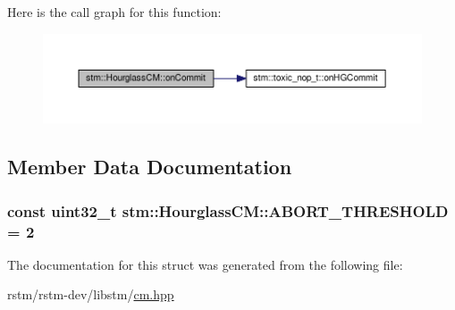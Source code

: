 Here is the call graph for this function\-:
\nopagebreak
\begin{figure}[H]
\begin{center}
\leavevmode
\includegraphics[width=350pt]{structstm_1_1HourglassCM_a59dc57fa05c484b45bd4fb1772d9f425_cgraph}
\end{center}
\end{figure}




\subsection{Member Data Documentation}
\hypertarget{structstm_1_1HourglassCM_ae26eaa2287446ea7c80a60341f1748d1}{
\subsubsection[{A\-B\-O\-R\-T\-\_\-\-T\-H\-R\-E\-S\-H\-O\-L\-D}]{\setlength{\rightskip}{0pt plus 5cm}const uint32\-\_\-t stm\-::\-Hourglass\-C\-M\-::\-A\-B\-O\-R\-T\-\_\-\-T\-H\-R\-E\-S\-H\-O\-L\-D = 2\hspace{0.3cm}{\ttfamily [static]}}}\label{structstm_1_1HourglassCM_ae26eaa2287446ea7c80a60341f1748d1}


The documentation for this struct was generated from the following file\-:\begin{DoxyCompactItemize}
\item 
rstm/rstm-\/dev/libstm/\hyperlink{cm_8hpp}{cm.\-hpp}\end{DoxyCompactItemize}
